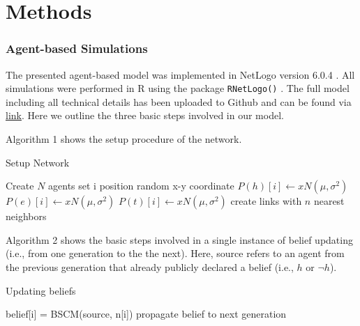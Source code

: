 \documentclass[doc,floatsintext]{apa6}
\begin{document}
\section{Methods}

\subsubsection{Agent-based Simulations}
The presented agent-based model was implemented in NetLogo version 6.0.4 \citep{wilensky1999netlogo}. All simulations were performed in R using the package {\tt RNetLogo()} \citep{thiele2014r}. The full model including all technical details has been uploaded to Github and can be found via \href{}{ link}. Here we outline the three basic steps involved in our model. 

Algorithm 1 shows the setup procedure of the network.


\begin{algorithm}[H]
\caption{Setup Network}\label{setup}
\begin{algorithmic}[1]
    \State Create $N$ agents
        \State set i position random x-y coordinate
     \EndFor
  \EndProcedure
      \State $P(h)[i]\gets x$\thicksim$N(\mu, \sigma^2)$ 
      \State $P(e)[i]\gets x$\thicksim$N(\mu, \sigma^2)$
      \State $P(t)[i]\gets x$\thicksim$N(\mu, \sigma^2)$
      \State create links with $n$ nearest neighbors 
     \EndFor
  \EndProcedure
\end{algorithmic}
\end{algorithm}

Algorithm 2 shows the basic steps involved in a single instance of belief updating (i.e., from one generation to the the next). Here, source refers to an agent from the previous generation that already publicly declared a belief (i.e., \(h\) or \(\neg h\)).

\begin{algorithm}[H]
\caption{Updating beliefs}\label{update}
\begin{algorithmic}[1]
             \State belief[i] = BSCM(source, n[i])
               \State propagate belief to next generation
              \EndIf
             \EndIf
        \EndFor
    \EndIf
  \EndProcedure
\end{algorithmic}
\end{algorithm}
\end{document}
